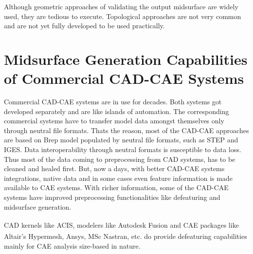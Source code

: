 
Although geometric approaches of validating the output midsurface are widely used, they are tedious to execute. Topological approaches are not very common and are not yet fully developed to be used practically. 

\section{Midsurface Generation Capabilities of Commercial CAD-CAE Systems}\label{sec:litsurvey:commercial}

Commercial CAD-CAE systems are in use for decades. Both systems got developed separately and are like islands of automation. The corresponding commercial systems have to transfer model data amongst themselves only through neutral file formats. Thats the reason, most of the CAD-CAE approaches are based on Brep model populated by neutral file formats, such as STEP and IGES.  Data interoperability through neutral formats is susceptible to data loss. Thus most of the data coming to preprocessing from CAD systems, has to be cleaned and healed first. But, now a days, with better CAD-CAE systems integrations, native data and in some cases even feature information is made available to CAE systems. With richer information, some of the CAD-CAE systems have improved preprocessing functionalities like defeaturing and midsurface generation. 

CAD kernels like ACIS\textsuperscript{\textregistered}, modelers like Autodesk Fusion\textsuperscript{\textregistered} and CAE packages like Altair's Hypermesh\textsuperscript{\textregistered}, Ansys\textsuperscript{\textregistered}, MSc Nastran\textsuperscript{\textregistered}, etc. do provide defeaturing capabilities mainly for CAE analysis size-based in nature. 

